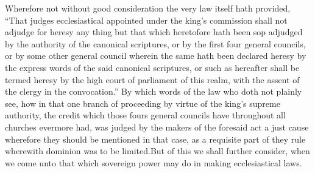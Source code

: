 Wherefore not without good consideration the very law itself hath provided, “That judges ecclesiastical appointed under the king’s commission shall not adjudge for heresy any thing but that which heretofore hath been sop adjudged  by the authority of the canonical scriptures, or by the first four general councils, or by some other general council wherein the same hath been declared heresy by the express words of the said canonical scriptures, or such as hereafter shall be termed heresy by the high court of parliament of this realm, with the assent of the clergy in the convocation.” By which words of the law who doth not plainly see, how in that one branch of proceeding by virtue of the king’s supreme authority, the credit which those fours general councils have throughout all churches evermore had, was judged by the makers of the foresaid act a just cause wherefore they should be mentioned in that case, as a requisite part of they rule wherewith dominion was to be limited.But of this we shall further consider, when we come unto that which sovereign power may do in making ecclesiastical laws.

